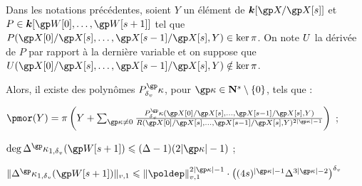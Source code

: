 \begin{lem} \label{l:param-aff}
  Dans les notations précédentes, soient \( Y \) un élément de \( \cdn[ \vp /
    \vp[\anydim] ] \) et \( P \in \cdn[ \anyvp[0], \dots, \anyvp[\anydim+1] ]
  \) tel que \( P( \vp[0] / \vp[\anydim], \dots, \vp[\anydim-1] /
    \vp[\anydim], Y ) \in \ker \pi \). On note \( U \) la dérivée de \( P \)
  par rapport à la dernière variable et on suppose que \( \pden( \vp[0] /
    \vp[\anydim], \dots, \vp[\anydim-1] / \vp[\anydim], Y ) \notin \ker \pi
  \).

  Alors, il existe des polynômes \( P_\dv^\derp \),
  pour \( \derp \in \N^{\anydim} \minusset0 \), tels que :
  \begin{enumthm}
    \item \( \pmor(Y) = \pi\left(
          Y +
          \sum_{\derp \neq 0} \frac{
            P_\dv^\derp( \vp[0] / \vp[\anydim], \dots,
            \vp[\anydim-1] / \vp[\anydim], Y )
          }{
            R( \vp[0] / \vp[\anydim], \dots,
            \vp[\anydim-1] / \vp[\anydim], Y )^{2\lgr\derp - 1}
          }
        \right)
      \) ;
    \item \( \deg \pmnum^\derp_{1, \dv} (\anyvp[\anydim+1])
        \le (\anydeg - 1) (2\lgr\derp - 1) \) ;
    \item \( \nv1{ \pmnum^\derp_{1, \dv} (\anyvp[\anydim+1]) }
        \le \nv1 \poldep ^{2\lgr\derp - 1}
        \cdot \left(
          (4\anydim)^{\lgr\derp -1} \anydeg^{3\lgr\derp -2}
        \right)^\dv \)
  \end{enumthm}
\end{lem}

